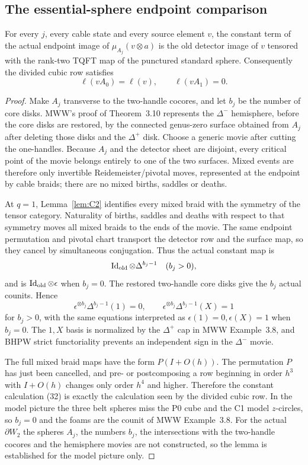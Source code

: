 \subsection{The essential-sphere endpoint comparison}

\begin{lemma}\label{lem:Sendpoint}
For every \(j\), every cable state and every source element \(v\), the
constant term of the actual endpoint image of
\(\mu_{A_j}(v\otimes a)\) is the old detector image of \(v\) tensored with
the rank-two TQFT map of the punctured standard sphere.  Consequently the
divided cubic row satisfies
\[
\ell(vA_0)=\ell(v),\qquad \ell(vA_1)=0.
\]
\end{lemma}

\begin{proof}
Make \(A_j\) transverse to the two-handle cocores, and let \(b_j\) be the
number of core disks.  MWW's proof of Theorem~3.10 represents the
\(\Delta^-\) hemisphere, before the core disks are restored, by the connected
genus-zero surface obtained from \(A_j\) after deleting those disks and the
\(\Delta^+\) disk.  Choose a generic movie after cutting the one-handles.
Because \(A_j\) and the detector sheet are disjoint, every critical point of
the movie belongs entirely to one of the two surfaces.  Mixed events are
therefore only invertible Reidemeister/pivotal moves, represented at the
endpoint by cable braids; there are no mixed births, saddles or deaths.

At \(q=1\), Lemma~\ref{lem:C2} identifies every mixed braid with the
symmetry of the tensor category.  Naturality of births, saddles and deaths
with respect to that symmetry moves all mixed braids to the ends of the
movie.  The same endpoint permutation and pivotal chart transport the
detector row and the surface map, so they cancel by simultaneous
conjugation.  Thus the actual constant map is
\[
\operatorname{Id}_{\rm old}\otimes\Delta^{b_j-1}\quad(b_j>0),
\]
and is \(\operatorname{Id}_{\rm old}\otimes\epsilon\) when \(b_j=0\).
The restored two-handle core disks give the \(b_j\) actual counits.  Hence
\[
\epsilon^{\otimes b_j}\Delta^{b_j-1}(1)=0,\qquad
\epsilon^{\otimes b_j}\Delta^{b_j-1}(X)=1
\tag{32}
\]
for \(b_j>0\), with the same equations interpreted as
\(\epsilon(1)=0,\epsilon(X)=1\) when \(b_j=0\).
The \(1,X\) basis is normalized by the \(\Delta^+\) cap in MWW
Example~3.8, and BHPW strict functoriality prevents an independent sign in
the \(\Delta^-\) movie.

The full mixed braid maps have the form \(P(I+O(h))\).  The permutation
\(P\) has just been cancelled, and pre- or postcomposing a row beginning in
order \(h^3\) with \(I+O(h)\) changes only order \(h^4\) and higher.
Therefore the constant calculation (32) is exactly the calculation seen by
the divided cubic row.  In the model picture the three belt spheres miss
the P0 cube and the C1 model $z$-circles, so $b_j=0$ and the foams are the
counit of MWW Example~3.8.  For the actual $\partial W_2$ the spheres
$A_j$, the numbers $b_j$, the intersections with the two-handle cocores and
the hemisphere movies are not constructed, so the lemma is established for
the model picture only.
\end{proof}

